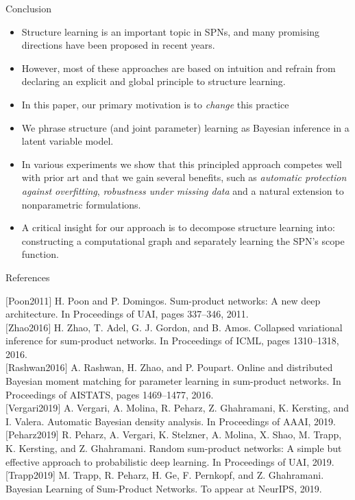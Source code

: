 \documentclass{beamer}
\begin{document}
\begin{frame}{}
\begin{center}Conclusion\end{center}
    \begin{itemize}
    \item Structure learning is an important topic in SPNs, and many promising directions have been proposed in recent years.
  \item However, most of these approaches are based on intuition and refrain from declaring an explicit and global principle to structure learning.
    \pause
  \item In this paper, our primary motivation is to \emph{change} this practice
  \pause
  \item We phrase structure (and joint parameter) learning as Bayesian inference in a latent variable model. 
  \pause
  \item In various experiments we show that this principled approach competes well with prior art and that we gain several benefits, such as \emph{automatic protection against overfitting}, \emph{robustness under missing data} and a natural extension to nonparametric formulations.
  \pause
  \item A critical insight for our approach is to decompose structure learning into: constructing a computational graph and separately learning the SPN's scope function.
  \end{itemize}
\end{frame}

\begin{frame}{}
\begin{center}References\end{center}
 \scriptsize $[$Poon2011$]$  H. Poon and P. Domingos. Sum-product networks: A new deep architecture. In Proceedings of UAI, pages 337–346, 2011.\\[1em]
  $[$Zhao2016$]$ H. Zhao, T. Adel, G. J. Gordon, and B. Amos. Collapsed variational inference for sum-product networks. In Proceedings of ICML, pages 1310–1318, 2016. \\[1em]
  $[$Rashwan2016$]$ A. Rashwan, H. Zhao, and P. Poupart. Online and distributed Bayesian moment matching for parameter learning in sum-product networks. In Proceedings of AISTATS, pages 1469–1477, 2016.\\[1em]
  $[$Vergari2019$]$ A. Vergari, A. Molina, R. Peharz, Z. Ghahramani, K. Kersting, and I. Valera. Automatic Bayesian density analysis. In Proceedings of AAAI, 2019.\\[1em]
  $[$Peharz2019$]$ R. Peharz, A. Vergari, K. Stelzner, A. Molina, X. Shao, M. Trapp, K. Kersting, and Z. Ghahramani. Random sum-product networks: A simple but effective approach to probabilistic deep learning. In Proceedings of UAI, 2019.\\[1em]
  \textcolor{CBYellow}{[Trapp2019] M. Trapp, R. Peharz, H. Ge, F. Pernkopf, and Z. Ghahramani. Bayesian Learning of Sum-Product Networks. To appear at NeurIPS, 2019.}
\end{frame}
\end{document}
